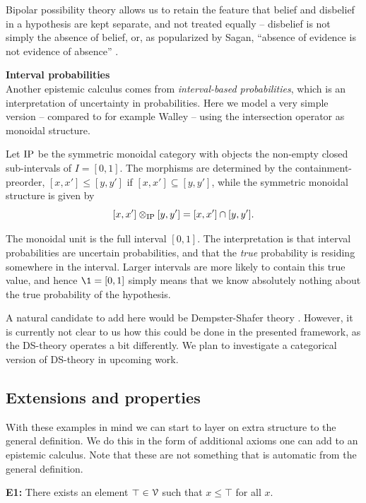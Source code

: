 Bipolar possibility theory allows us to retain the feature that belief and disbelief in a hypothesis are kept separate, and not treated equally -- disbelief is not simply the absence of belief, or, as popularized by Sagan, ``absence of evidence is not evidence of absence'' \cite{sagan_1997}. 

\textbf{Interval probabilities} \\
Another epistemic calculus comes from \emph{interval-based probabilities}, which is an interpretation of uncertainty in probabilities. Here we model a very simple version -- compared to for example Walley \cite{walley_1991} -- using the intersection operator as monoidal structure. 

Let $\mathrm{IP}$ be the symmetric monoidal category with objects the non-empty closed sub-intervals of $I = [0,1]$. The morphisms are determined by the containment-preorder, $[x,x']\leq [y,y']$ if $[x,x'] \subseteq [y, y']$, while the symmetric monoidal structure is given by 
\[[x,x']\otimes_{\mathrm{IP}} [y,y'] = [x,x']\cap [y, y'].\]

The monoidal unit is the full interval $[0,1]$. The interpretation is that interval probabilities are uncertain probabilities, and that the \emph{true} probability is residing somewhere in the interval. Larger intervals are more likely to contain this true value, and hence $\1 = [0,1]$ simply means that we know absolutely nothing about the true probability of the hypothesis.

\begin{remark}
    A natural candidate to add here would be Dempster-Shafer theory \cite{dempster_1967, shafer_1976}. However, it is currently not clear to us how this could be done in the presented framework, as the DS-theory operates a bit differently. We plan to investigate a categorical version of DS-theory in upcoming work. 
\end{remark}


\subsection{Extensions and properties}
With these examples in mind we can start to layer on extra structure to the general definition. We do this in the form of additional axioms one can add to an epistemic calculus. Note that these  are not something that is automatic from the general definition. 

\textbf{E1:} There exists an element $\top \in \EuScript{V}$ such that $x\leq \top$ for all $x$. 

